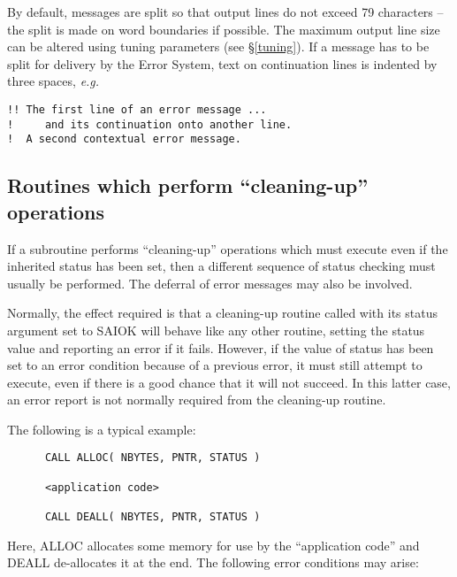 \documentclass[twoside,11pt]{article}
\newcommand{\htmlref}[2]{#1}
\newcommand{\latex}[1]{#1}
\newcommand{\xlabel}[1]{}
\renewcommand{\_}{\texttt{\symbol{95}}}
\begin{document}
By default, messages are split so that output lines do not exceed 
79 characters -- the split is made on word boundaries if possible. 
The maximum output line size can be altered using
\htmlref{tuning parameters}{tuning}\latex{ (see \S\ref{tuning})}.
If a message has to be split for delivery by the Error System, text on 
continuation lines is indented by three spaces, \textit{e.g.}
\begin {small}
\begin{verbatim}
!! The first line of an error message ...
!     and its continuation onto another line.
!  A second contextual error message.
\end{verbatim}
\end {small}

\subsection{\xlabel{routines_which_perform_cleaningup_operations}Routines which perform ``cleaning-up'' operations}

If a subroutine performs ``cleaning-up'' operations which must execute even
if the inherited status has been set, then a different sequence of status 
checking must usually be performed.
The deferral of error messages may also be involved.

Normally, the effect required is that a cleaning-up routine called with 
its status argument set to SAI\_\_OK will behave like any other routine, 
setting the status value and reporting an error if it fails.
However, if the value of status has been set to an error condition because of 
a previous error, it must still attempt to execute, even if there is a
good chance that it will not succeed.
In this latter case, an error report is not normally required from the
cleaning-up routine. 

The following is a typical example:

\begin {small}
\begin{verbatim}
      CALL ALLOC( NBYTES, PNTR, STATUS )

      <application code>

      CALL DEALL( NBYTES, PNTR, STATUS )
\end{verbatim}
\end {small}

Here, ALLOC allocates some memory for use by the ``application code'' and 
DEALL de-allocates it at the end.
The following error conditions may arise:
\end{document}
